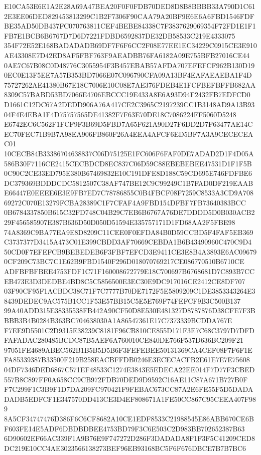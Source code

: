 \documentclass[UTF8,fontset=fandol,zihao=-4,a4paper]{ctexart}
\begin{document}
{{E10CA53E6E1A2E28A69A47BEA20F0F0FDB70DED8D8B8BBBB33A790D1C612E3EE06DED829453813299C1B2F7306F90CAA79A20BF9E6E6A6FBD1546FDF
BE35AD50DB437FC070763811CEF4BEBE84338C7F3837629069354F72FD1E1F1FB7E1BCB6B6767D7D6D7221FDBD6592837DE32DB58533C219E4333075
354F72E52E168BADADADB69DF7F6F6CC2F08E77EE1EC34229C0915CE3E910AE43308E7D42ED8AF5FBF763F9AEADBB76FA6182A09E755BFB27016CE44
0AE7C67B08C0D48776C3055954F3B457EBAB57AFDA707EFEFCF962B130D190EC0E13F5EE7A57B353BD7066E07C096790CFA09A13BF4EAFAEAEBA1F4D
75727262AE41380B67E18C7006E10C08E7AE376FDEB4E1FCFBEFBFFB682AA8309C57BABD53BD7066E4706EBCCC19E433A8E6A93D94F2432FB7EDFCD0
D1661C12DC67A2DEDD906A76A417CE2C3965C2197239CC1B3148AD9A13B9304F4E4EBA1F4D75757565DE41382F7F63E70DE18C7086224FF5060D5248
E6742EC6C562F1FCF9F3B69D5FBD7A65F621A90D27F6DD2D7F63477AE14CEC70FEC71B9B7A98EA906FB860F26A4EEA4AFCF6ED5BF7A3A9CECECEAC01
10CECB84B33386704638837C06D75125E1FC606F6FAF0DE7ADAD2D1F4D05A586B30F7116CE2415CECBDCD8EC837C06D59C88EBEBEBEE47531D1F1F5B
0C90C2CE33ED795E380B67469832E10C191DFE8D188C59CD695E746FDFBE6DC379369BDDDCDC5812507C38AF747BE12C9C99249C1B7FAD0DF219EAAB
E66447E0EEEE6E3E9FB7ED7C78786855C0B4FBCF08F7259C8533A3CD9A70869272C070E13279FCBA28389C1F7CFAF4A9FBD154DFBF7FB73640383BCC
0B6784337850B615C32FD748C04B29C7EB6B6767A76DE7DDDD5D0B030ACB229F456585907E387B636D50D050D51594E335757171D1FD68AA2F5FBE98
74A8369C9BA77EA9E8D8209C11CEE0F0EFDA84B0D59CCBD5F4FAF5EB369C3737377D3415A473C01E399CBDD3AF70669CEBDA1B6B43490960C470C9D4
50CD0F7EFEFCB9BEBEDEB6F3FBF7EFCD3E9411CE3E8B4A3893E6AC096790CF209C73BC7C1E62B9FBD1540F296D018070769217CE086770510B6710CE
ADFBFBFBEE4753FDF1C71F160008672779E18C700697B6768681D7C893B7CCEB473E3D3DEDBE4BD8C5C5856500E3EC30E9DC917016CE2412CE8DF707
03F90CF95F1ACBDC38C71F7C7777B70DE7172F5E5809209C1DE3853343264E38439DEDEC9AC575B1CC1F53E57BB15C5E5E769F74FEFCF9B3C500B137
99A40ADD315E38335538FB442A90CF50D8E530E481327D8787876D38CFE7F3BBBB3B4B0284B363BC704638030A1A86547361E17C7373339BCDDA767E
F7EE9D5501C2D9315E38239C8181F96CB810CE855D171F3E7C68C3797D7DFDFAFADAC280485BCDC87B5AEF6A760010CE840DE766F537D636BC209F21
97051FE4689ABEC562B1B5B5D5B6F3FEFEBEE50131369CA4CEF08F7F6F1EFA85339387B33500F219B258EACBFFDB0246E3ECECACFB2E61E7E7E75608
04DF7346DED6867C571EF48533C1274E3843E5EDECA22EE014F7D77F3CBED557B8C897FF0A658CC9CB972FDB70DED9D9592C16AE11C87A671B727B0F
F7C299F1C3B9F1D7DA209FC970421F9FEBAC673CC87A2E6FE55F5D5DADADADB5EDFCF1E347570DD413CE3D4EF808671A1FE50CC867C95CEEA407F989
8A5CF34747476D386F6C6CF8682A10CE1EDF8533C21988545E86ABB670CE6BF603FE14E5ADF6DBDBDBEE4753BD79F3C6E503C2D983BB702652387B63
6D90602EF66AC339F1A9B76E9F747272D286F3DADADA8F1F3F5C41209CED8DC219E10CC4AE3023566138273BEF96EB93168BC5F6F676DBCE7B7B7BC6
}}
\end{document}
